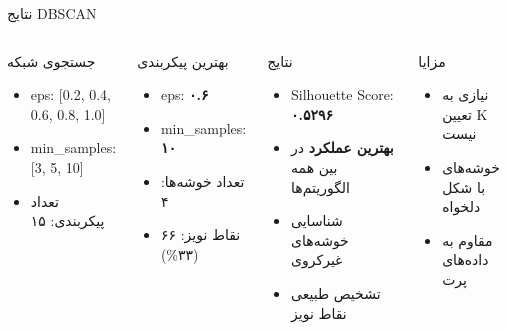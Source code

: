 \documentclass[aspectratio=169]{beamer}
\begin{document}
\begin{frame}{نتایج DBSCAN}
\begin{columns}
\begin{block}{جستجوی شبکه}
\begin{itemize}
\item eps: [0.2, 0.4, 0.6, 0.8, 1.0]
\item min\_samples: [3, 5, 10]
\item تعداد پیکربندی: ۱۵
\end{itemize}
\end{block}

\begin{block}{بهترین پیکربندی}
\begin{itemize}
\item eps: \textbf{۰.۶}
\item min\_samples: \textbf{۱۰}
\item تعداد خوشه‌ها: ۴
\item نقاط نویز: ۶۶ (۳۳\%)
\end{itemize}
\end{block}

\begin{block}{نتایج}
\begin{itemize}
\item Silhouette Score: \textcolor{important}{\textbf{۰.۵۲۹۶}}
\item \textcolor{success}{\textbf{بهترین عملکرد}} در بین همه الگوریتم‌ها
\item شناسایی خوشه‌های غیرکروی
\item تشخیص طبیعی نقاط نویز
\end{itemize}
\end{block}

\begin{block}{مزایا}
\begin{itemize}
\item نیازی به تعیین K نیست
\item خوشه‌های با شکل دلخواه
\item مقاوم به داده‌های پرت
\end{itemize}
\end{block}
\end{columns}
\end{frame}
\end{document}
